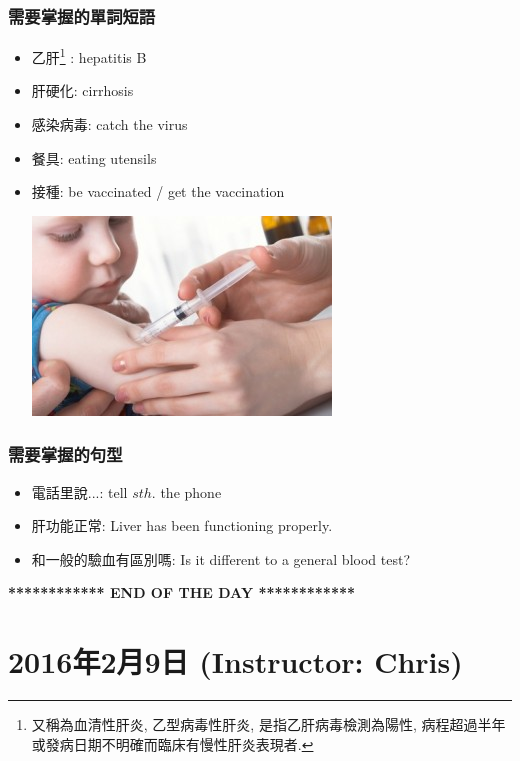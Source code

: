\subsubsection*{需要掌握的單詞短語}
\begin{itemize}
  \itemsep0em
  \item 乙肝\footnote{又稱為血清性肝炎, 乙型病毒性肝炎, 是指乙肝病毒檢測為陽性, 病程超過半年或發病日期不明確而臨床有慢性肝炎表現者.} : hepatitis B
  \item 肝硬化: cirrhosis
  \item 感染病毒: catch the virus
  \item 餐具: eating utensils
  \item 接種: be vaccinated / get the vaccination
  \begin{center}
    \includegraphics[scale=.7]{pics/vaccinated}
  \end{center}
\end{itemize}

\subsubsection*{需要掌握的句型}
\begin{itemize}
  \itemsep0em
  \item 電話里說...: tell $sth.$  the phone
  \item 肝功能正常: Liver has been functioning properly.
  \item 和一般的驗血有區別嗎: Is it different to a general blood test?
\end{itemize}

\vspace{15mm}

\begin{center}
  \textbf{************ END OF THE DAY ************}
\end{center}

\newpage

\section{2016年2月9日 (Instructor: Chris)}
